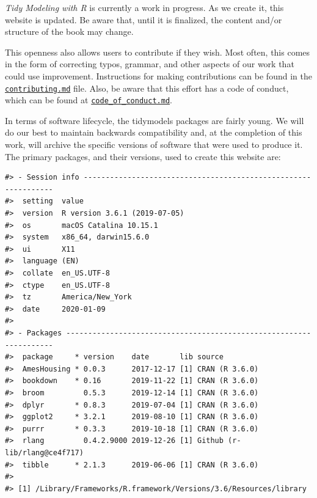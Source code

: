 \documentclass[11pt]{book}
\begin{document}
\emph{Tidy Modeling with R} is currently a work in progress. As we create it, this website is updated. Be aware that, until it is finalized, the content and/or structure of the book may change.

This openness also allows users to contribute if they wish. Most often, this comes in the form of correcting typos, grammar, and other aspects of our work that could use improvement. Instructions for making contributions can be found in the \href{https://github.com/topepo/TMwR/blob/master/contributing.md}{\texttt{contributing.md}} file. Also, be aware that this effort has a code of conduct, which can be found at \href{https://github.com/topepo/TMwR/blob/master/code_of_conduct.md}{\texttt{code\_of\_conduct.md}}.

In terms of software lifecycle, the tidymodels packages are fairly young. We will do our best to maintain backwards compatibility and, at the completion of this work, will archive the specific versions of software that were used to produce it. The primary packages, and their versions, used to create this website are:

\begin{verbatim}
#> - Session info ---------------------------------------------------------------
#>  setting  value                       
#>  version  R version 3.6.1 (2019-07-05)
#>  os       macOS Catalina 10.15.1      
#>  system   x86_64, darwin15.6.0        
#>  ui       X11                         
#>  language (EN)                        
#>  collate  en_US.UTF-8                 
#>  ctype    en_US.UTF-8                 
#>  tz       America/New_York            
#>  date     2020-01-09                  
#> 
#> - Packages -------------------------------------------------------------------
#>  package     * version    date       lib source                      
#>  AmesHousing * 0.0.3      2017-12-17 [1] CRAN (R 3.6.0)              
#>  bookdown    * 0.16       2019-11-22 [1] CRAN (R 3.6.0)              
#>  broom         0.5.3      2019-12-14 [1] CRAN (R 3.6.0)              
#>  dplyr       * 0.8.3      2019-07-04 [1] CRAN (R 3.6.0)              
#>  ggplot2     * 3.2.1      2019-08-10 [1] CRAN (R 3.6.0)              
#>  purrr       * 0.3.3      2019-10-18 [1] CRAN (R 3.6.0)              
#>  rlang         0.4.2.9000 2019-12-26 [1] Github (r-lib/rlang@ce4f717)
#>  tibble      * 2.1.3      2019-06-06 [1] CRAN (R 3.6.0)              
#> 
#> [1] /Library/Frameworks/R.framework/Versions/3.6/Resources/library
\end{verbatim}
\end{document}
